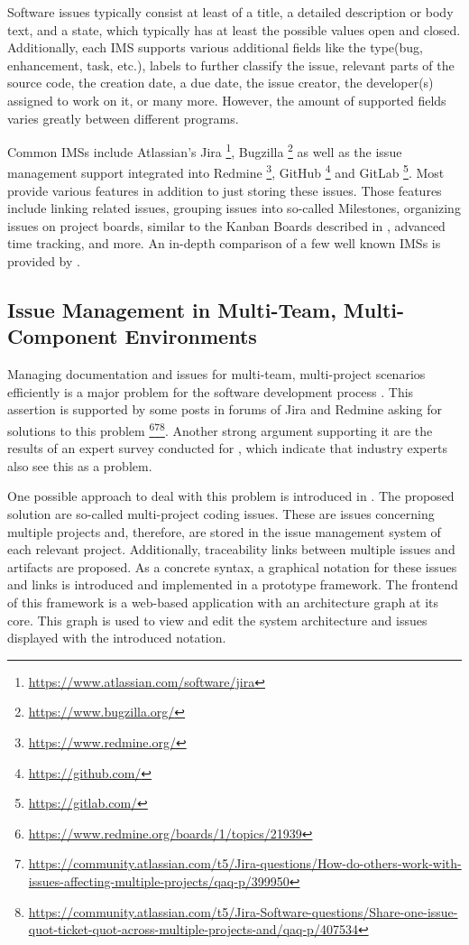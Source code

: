 Software issues typically consist at least of a title, a detailed description or body text, and a state, 
which typically has at least the possible values open and closed.
Additionally, each \gls{IMS} supports various additional fields like the type(bug, enhancement, task, etc.), 
labels to further classify the issue, relevant parts of the source code, the creation date, a due date, the issue creator, the developer(s) assigned to work on it, or many more.
However, the amount of supported fields varies greatly between different programs.

Common \glspl{IMS} include Atlassian's Jira \footnote{\url{https://www.atlassian.com/software/jira}}, 
Bugzilla \footnote{\url{https://www.bugzilla.org/}} 
as well as the issue management support integrated into Redmine \footnote{\url{https://www.redmine.org/}}, 
GitHub \footnote{\url{https://github.com/}} and 
GitLab \footnote{\url{https://gitlab.com/}}.
Most provide various features in addition to just storing these issues. 
Those features include linking related issues, grouping issues into so-called Milestones, organizing issues on project boards, similar to the Kanban Boards described in \cite{epping2011kanban}, advanced time tracking, and more.
An in-depth comparison of a few well known \glspl{IMS} is provided by \cite{janak2009issue}. 

\subsection{Issue Management in Multi-Team, Multi-Component Environments}
\label{ssec:ch2:ss1.2}
Managing documentation and issues for multi-team, multi-project scenarios efficiently is a major problem for the software development process  \cite{mahmood2015identifying}. This assertion is supported by some posts in forums of Jira and Redmine asking for solutions to this problem \footnote{\url{https://www.redmine.org/boards/1/topics/21939}}\footnote{\url{https://community.atlassian.com/t5/Jira-questions/How-do-others-work-with-issues-affecting-multiple-projects/qaq-p/399950}}\footnote{\url{https://community.atlassian.com/t5/Jira-Software-questions/Share-one-issue-quot-ticket-quot-across-multiple-projects-and/qaq-p/407534}}. Another strong argument supporting it are the results of an expert survey conducted for \cite{Speth2019}, which indicate that industry experts also see this as a problem.

One possible approach to deal with this problem is introduced in \cite{Speth2019}.
The proposed solution are so-called multi-project coding issues. These are issues concerning multiple projects and, therefore, are stored in the issue management system of each relevant project. Additionally, traceability links between multiple issues and artifacts are proposed. As a concrete syntax, a graphical notation for these issues and links is introduced and implemented in a prototype framework. The frontend of this framework is a web-based application with an architecture graph at its core.
This graph is used to view and edit the system architecture and issues displayed with the introduced notation. 

